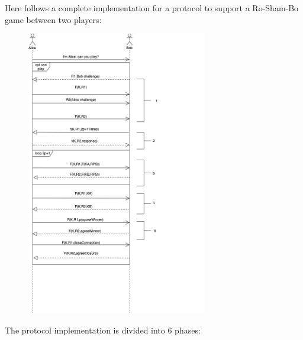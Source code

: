 \documentclass{article}
\begin{document}
Here follows a complete implementation for a protocol to support a Ro-Sham-Bo game between two players:

	\begin{figure}[h]
		\includegraphics[width=0.7\textwidth ]{images/protocol.png}
		\centering
	\end{figure}
	
The protocol implementation is divided into 6 phases:
\end{document}
